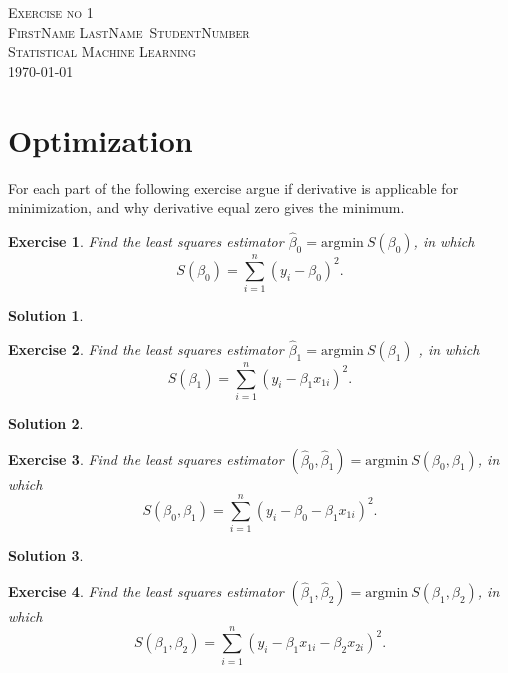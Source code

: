 \documentclass[12pt,a4paper]{article}
\def\StudentName{FirstName LastName}
\def\StudentMatricule{StudentNumber}
\def\ExerciseNo{1}
\def\argmin{\mathrm{argmin}} %
\newtheorem{exercise}{Exercise}
\numberwithin{exercise}{section} %
\newtheorem{solution}{Solution}
\numberwithin{solution}{section} %
\begin{document}
\begin{titlepage}
\begin{center}
\textsc{\LARGE Exercise no \ExerciseNo}\\[1.5cm]
\vspace{2in}
\textsc{\Large \StudentName~\StudentMatricule}\\[0.5cm]
\textsc{Statistical Machine Learning}\\[0.5cm]
\today
\end{center}
\end{titlepage}




\section{Optimization} For each part of the following exercise argue if derivative is applicable for minimization, and why derivative equal zero gives the minimum. 

\begin{exercise} Find the least squares estimator $\hat \beta_0=\argmin~S(\beta_0)$, in which $$S(\beta_0)=\sum_{i=1}^n (y_i -\beta_0 )^2.$$
\end{exercise}

\begin{solution}
\end{solution}

\begin{exercise} 
Find the least squares estimator $\hat \beta_1=\argmin~S(\beta_1)$ , in which $$S(\beta_1)=\sum_{i=1}^n (y_i -\beta_1 x_{1i})^2.$$
\end{exercise}

\begin{solution}
\end{solution}




\begin{exercise}
 Find the least squares estimator $(\hat \beta_0,\hat \beta_1)=\argmin~S(\beta_0,\beta_1)$, in which $$S(\beta_0,\beta_1)=\sum_{i=1}^n (y_i-\beta_0 -\beta_1 x_{1i})^2.$$
\end{exercise}

\begin{solution}
\end{solution}



\begin{exercise}
 Find the least squares estimator $(\hat \beta_1,\hat \beta_2)=\argmin~S(\beta_1,\beta_2)$, in which $$S(\beta_1,\beta_2)=\sum_{i=1}^n (y_i-\beta_1 x_{1i}-\beta_2 x_{2i})^2.$$\\
\end{exercise}
\end{document}
